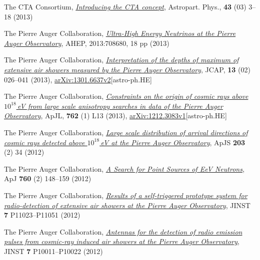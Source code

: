 \begin{etaremune}
\item {}The CTA Consortium, \href{http://dx.doi.org/10.1016/j.astropartphys.2013.01.007}{\emph{Introducing the CTA concept}}, Astropart. Phys., {\bf{43}} (03) 3--18 (2013)

\item {}The Pierre Auger Collaboration, \href{http://dx.doi.org/10.1155/2013/708680
}{\emph{Ultra-High Energy Neutrinos at the Pierre Auger Observatory}}, AHEP, 2013:708680, 18 pp (2013)

\item {}The Pierre Auger Collaboration, \href{http://dx.doi.org/10.1088/1475-7516/2013/02/026}{\emph{Interpretation of the depths of maximum of extensive air showers measured by the Pierre Auger Observatory}}, JCAP, {\bf{13}} (02) 026--041 (2013), \href{http://arxiv.org/abs/1301.6637}{arXiv:1301.6637v2}[astro-ph.HE]

\item {}The Pierre Auger Collaboration, \href{http://dx.doi.org/10.1088/2041-8205/762/1/L13}{\emph{Constraints on the origin of cosmic rays above $10^{18}$\,eV from large scale anisotropy searches in data of the Pierre Auger Observatory}}, ApJL, {\bf{762}} (1) L13 (2013), \href{http://arxiv.org/abs/1212.3083}{arXiv:1212.3083v1}[astro-ph.HE]

\item {}The Pierre Auger Collaboration,
\href{http://dx.doi.org/10.1088/0067-0049/203/2/34}{\emph{Large scale
distribution of arrival directions of cosmic rays detected above $10^{18}$\,eV
at the Pierre Auger Observatory}}, ApJS {\bf{203}} (2) 34 (2012)

\item {}The Pierre Auger Collaboration,
\href{http://dx.doi.org/10.1088/0004-637X/760/2/148}{\emph{A Search for Point
Sources of EeV Neutrons}}, ApJ {\bf{760}} (2) 148--159 (2012)

\item {}The Pierre Auger Collaboration,
\href{http://dx.doi.org/10.1088/1748-0221/7/11/P11023}{\emph{Results of a
self-triggered prototype system for radio-detection of extensive air showers at
the Pierre Auger Observatory}}, JINST {\bf{7}} P11023--P11051 (2012)

\item {}The Pierre Auger Collaboration,
\href{http://dx.doi.org/10.1088/1748-0221/7/10/P10011}{\emph{Antennas for the
detection of radio emission pulses from cosmic-ray induced air showers at the
Pierre Auger Observatory}}, JINST {\bf{7}} P10011--P10022 (2012)


\end{etaremune}

